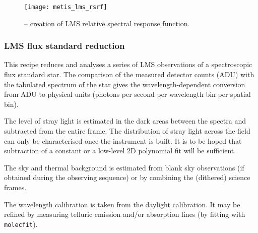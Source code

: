\begin{figure}[hb]
  \centering
  \texttt{[image: metis\_lms\_rsrf]}
  \caption[Recipe: ]{ --
    creation of LMS relative spectral response function.}
  \label{fig:metis_lms_rsrf}
\end{figure}


\clearpage
\subsubsection{LMS flux standard reduction}
\label{sssec:lms_std_process}

This recipe reduces and analyses a series of LMS observations of a
spectroscopic flux standard star. The comparison of the measured
detector counts (ADU) with the tabulated spectrum of the star gives
the wavelength-dependent conversion from ADU to physical units
(photons per second per wavelength bin per spatial bin).

The level of stray light is estimated in the dark areas between the
spectra and subtracted from the entire frame. The distribution of
stray light across the field can only be characterised once the
instrument is built. It is to be hoped that subtraction of a constant
or a low-level 2D polynomial fit will be sufficient.

The sky and thermal background is estimated from blank sky
observations (if obtained during the observing sequence) or by
combining the (dithered) science frames.

The wavelength calibration is taken from the daylight calibration. It
may be refined by measuring telluric emission and/or absorption lines
(by fitting with \lstinline{molecfit}).

